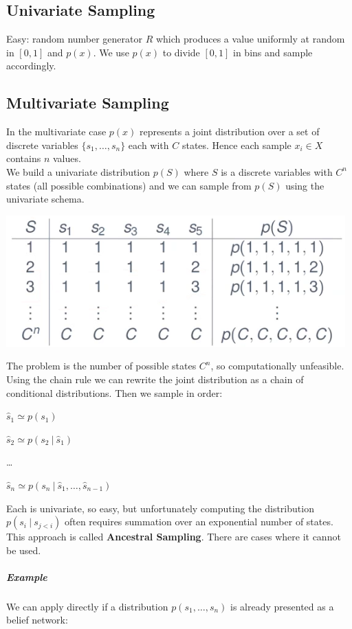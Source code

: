 \documentclass[10pt]{report}
\begin{document}
\subsection{Univariate Sampling}
Easy: random number generator $R$ which produces a value uniformly at random in $[0,1]$ and $p(x)$. We use $p(x)$ to divide $[0,1]$ in bins and sample accordingly.
\subsection{Multivariate Sampling}
In the multivariate case $p(x)$ represents a joint distribution over a set of discrete variables $\{s_1,\ldots,s_n\}$ each with $C$ states. Hence each sample $x_i\in X$ contains $n$ values.\\
We build a univariate distribution $p(S)$ where $S$ is a discrete variables with $C^n$ states (all possible combinations) and we can sample from $p(S)$ using the univariate schema.
\begin{center}
	\includegraphics[scale=0.5]{44.png}
\end{center}
The problem is the number of possible states $C^n$, so computationally unfeasible.\\
Using the chain rule we can rewrite the joint distribution as a chain of conditional distributions. Then we sample in order:
\begin{list}{}{}
	\item $\hat{s}_1 \simeq p(s_1)$
	\item $\hat{s}_2 \simeq p(s_2\:|\:\hat{s}_1)$
	\item \ldots
	\item $\hat{s}_n \simeq p(s_n\:|\:\hat{s}_1,\ldots,\hat{s}_{n-1})$
\end{list}
Each is univariate, so easy, but unfortunately computing the distribution $p(s_i\:|\:s_{j<i})$ often requires summation over an exponential number of states.\\
This approach is called \textbf{Ancestral Sampling}. There are cases where it cannot be used.
\subparagraph{Example} We can apply directly if a distribution $p(s_1,\ldots,s_n)$ is already presented as a belief network:
\end{document}
